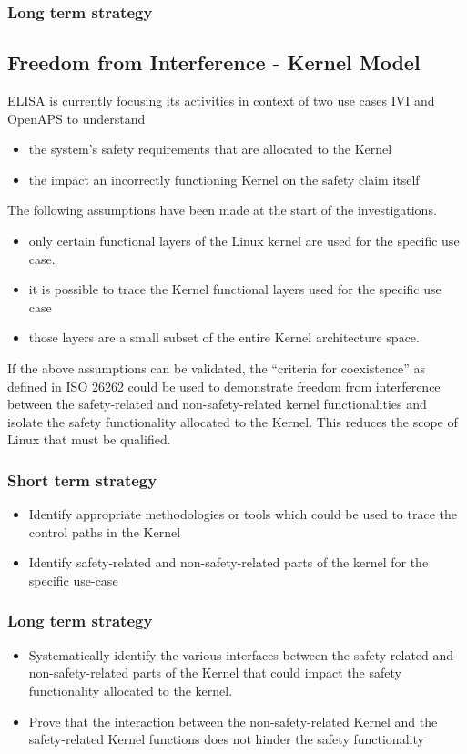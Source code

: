 \documentclass[12pt]{../Common_files/ElisaPaper}
\begin{document}
\subsubsection{Long term strategy}  

\subsection{Freedom from Interference - Kernel Model}
ELISA is currently focusing its activities in context of two use cases IVI and OpenAPS to understand
\begin{itemize} 
	\item the system's safety requirements that are allocated to the Kernel
	\item the impact an incorrectly functioning Kernel on the safety claim itself 
\end{itemize}
The following assumptions have been made at the start of the investigations.
\begin{itemize}
	\item 	only certain functional layers of the Linux kernel are used for the specific use case. 
	\item 	it is possible to trace the Kernel functional layers used for the specific use case
	\item   those layers are a small subset of the entire Kernel architecture space.
\end{itemize} 

If the above assumptions can be validated, the “criteria for coexistence”
as defined in ISO 26262 
could be used to demonstrate freedom from interference between the safety-related and non-safety-related kernel functionalities
and isolate the safety functionality allocated to the Kernel. 
This reduces the scope of Linux that must be qualified.

\subsubsection{Short term strategy}
\begin{itemize}
	\item	Identify appropriate methodologies or tools which could be used to trace the control paths in the Kernel 
	\item	Identify safety-related and non-safety-related parts of the kernel for the specific use-case
\end{itemize}
\subsubsection{Long term strategy}
\begin{itemize}
\item	Systematically identify the various interfaces between the safety-related and non-safety-related parts of the Kernel that could impact the safety functionality allocated to the kernel.
\item	Prove that the interaction between the non-safety-related Kernel and the safety-related Kernel functions does not hinder the safety functionality
\end{itemize}
\end{document}
